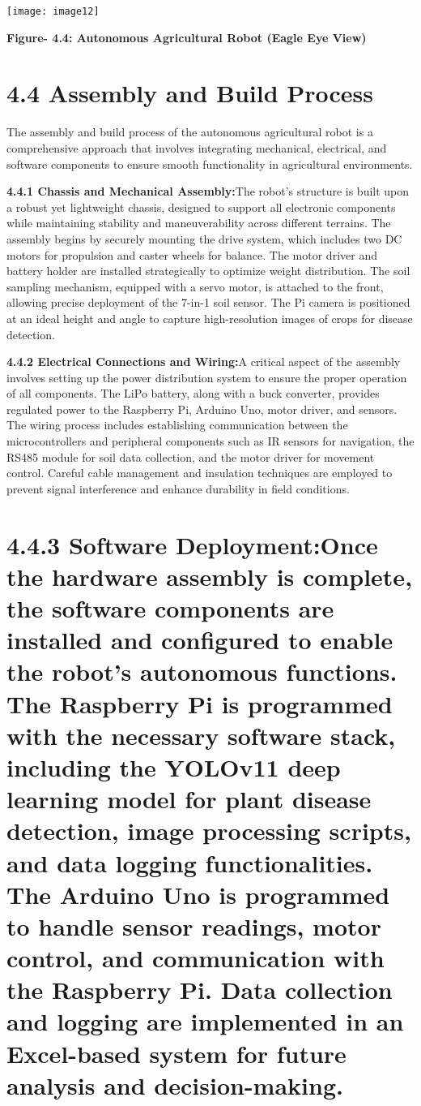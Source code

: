 \documentclass{book} %
\begin{document}
\noindent \texttt{[image: image12]}

\noindent \textbf{Figure- 4.4: Autonomous Agricultural Robot (Eagle Eye View)}

\noindent \textbf{}

\noindent \textbf{}

\noindent 
\section{4.4 Assembly and Build Process}

\noindent The assembly and build process of the autonomous agricultural robot is a comprehensive approach that involves integrating mechanical, electrical, and software components to ensure smooth functionality in agricultural environments.

\noindent \textbf{4.4.1 Chassis and Mechanical Assembly:}The robot's structure is built upon a robust yet lightweight chassis, designed to support all electronic components while maintaining stability and maneuverability across different terrains. The assembly begins by securely mounting the drive system, which includes two DC motors for propulsion and caster wheels for balance. The motor driver and battery holder are installed strategically to optimize weight distribution. The soil sampling mechanism, equipped with a servo motor, is attached to the front, allowing precise deployment of the 7-in-1 soil sensor. The Pi camera is positioned at an ideal height and angle to capture high-resolution images of crops for disease detection.

\noindent \textbf{4.4.2 Electrical Connections and Wiring:}A critical aspect of the assembly involves setting up the power distribution system to ensure the proper operation of all components. The LiPo battery, along with a buck converter, provides regulated power to the Raspberry Pi, Arduino Uno, motor driver, and sensors. The wiring process includes establishing communication between the microcontrollers and peripheral components such as IR sensors for navigation, the RS485 module for soil data collection, and the motor driver for movement control. Careful cable management and insulation techniques are employed to prevent signal interference and enhance durability in field conditions.

\noindent 
\section{4.4.3 Software Deployment:Once the hardware assembly is complete, the software components are installed and configured to enable the robot's autonomous functions. The Raspberry Pi is programmed with the necessary software stack, including the YOLOv11 deep learning model for plant disease detection, image processing scripts, and data logging functionalities. The Arduino Uno is programmed to handle sensor readings, motor control, and communication with the Raspberry Pi. Data collection and logging are implemented in an Excel-based system for future analysis and decision-making.}
\end{document}

